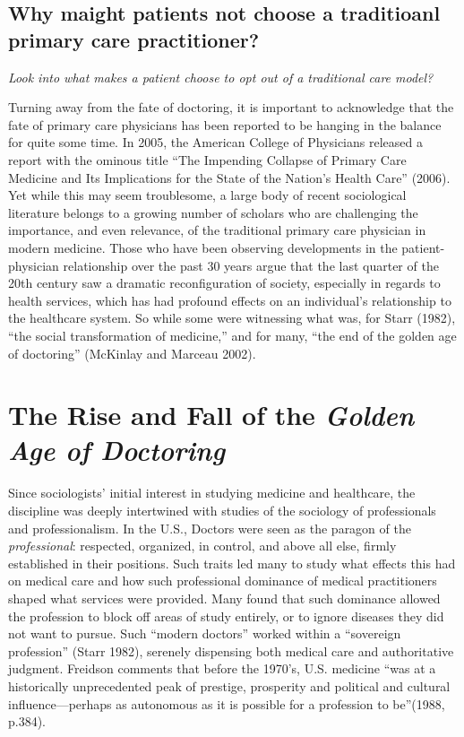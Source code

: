\documentclass[12pt,twoside]{reedthesis}
\begin{document}
  \subsection{Why maight patients not choose a traditioanl primary care
  practitioner?}\label{why-maight-patients-not-choose-a-traditioanl-primary-care-practitioner}
  
  \emph{Look into what makes a patient choose to opt out of a traditional
  care model?}
  
  Turning away from the fate of doctoring, it is important to acknowledge
  that the fate of primary care physicians has been reported to be hanging
  in the balance for quite some time. In 2005, the American College of
  Physicians released a report with the ominous title ``The Impending
  Collapse of Primary Care Medicine and Its Implications for the State of
  the Nation's Health Care'' (2006). Yet while this may seem troublesome,
  a large body of recent sociological literature belongs to a growing
  number of scholars who are challenging the importance, and even
  relevance, of the traditional primary care physician in modern medicine.
  Those who have been observing developments in the patient-physician
  relationship over the past 30 years argue that the last quarter of the
  20th century saw a dramatic reconfiguration of society, especially in
  regards to health services, which has had profound effects on an
  individual's relationship to the healthcare system. So while some were
  witnessing what was, for Starr (1982), ``the social transformation of
  medicine,'' and for many, ``the end of the golden age of doctoring''
  (McKinlay and Marceau 2002).
  
  \section*{\texorpdfstring{The Rise and Fall of the \emph{Golden Age of
  Doctoring}}{The Rise and Fall of the Golden Age of Doctoring}}\label{the-rise-and-fall-of-the-golden-age-of-doctoring}
  
  Since sociologists' initial interest in studying medicine and
  healthcare, the discipline was deeply intertwined with studies of the
  sociology of professionals and professionalism. In the U.S., Doctors
  were seen as the paragon of the \emph{professional}: respected,
  organized, in control, and above all else, firmly established in their
  positions. Such traits led many to study what effects this had on
  medical care and how such professional dominance of medical
  practitioners shaped what services were provided. Many found that such
  dominance allowed the profession to block off areas of study entirely,
  or to ignore diseases they did not want to pursue. Such ``modern
  doctors'' worked within a ``sovereign profession'' (Starr 1982),
  serenely dispensing both medical care and authoritative judgment.
  Freidson comments that before the 1970's, U.S. medicine ``was at a
  historically unprecedented peak of prestige, prosperity and political
  and cultural influence---perhaps as autonomous as it is possible for a
  profession to be''(1988, p.384).
  
\end{document}
